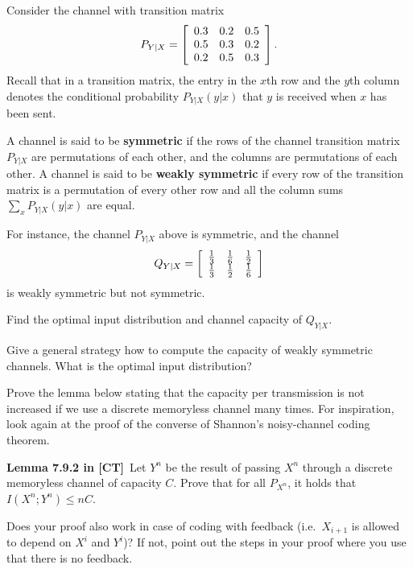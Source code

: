 \documentclass[a4paper,10pt,landscape,twocolumn]{scrartcl}
\begin{document}
\begin{exercise}
Consider the channel with transition matrix
\[
P_{Y|X} = \left[
\begin{array}{c c c}
0.3&0.2&0.5\\
0.5&0.3&0.2\\
0.2&0.5&0.3
\end{array}
\right].
\]
Recall that in a transition matrix, the entry in the $x$th row and the $y$th column denotes the conditional probability $P_{Y|X}(y|x)$ that $y$ is received when $x$ has been sent.

A channel is said to be \textbf{symmetric} if the rows of the channel transition matrix $P_{Y|X}$ are permutations of each other, and the columns are permutations of each other. A channel is said to be \textbf{weakly symmetric} if every row of the transition matrix is a permutation of every other row and all the column sums $\sum_x P_{Y|X}(y|x)$ are equal.

For instance, the channel $P_{Y|X}$ above is symmetric, and the channel
\[
Q_{Y|X} = \left[
\begin{array}{c c c}
\frac{1}{3}&\frac{1}{6}&\frac{1}{2}\\
\frac{1}{3}&\frac{1}{2}&\frac{1}{6}
\end{array}
\right]
\]
is weakly symmetric but not symmetric.
	\begin{subex}
	Find the optimal input distribution and channel capacity of $Q_{Y|X}$.
	\end{subex}
	\begin{subex}
	Give a general strategy how to compute the capacity of weakly symmetric channels. What is the optimal input distribution?
	\end{subex}
\end{exercise}

\begin{exercise}
Prove the lemma below stating that the capacity per transmission is not increased if we use a discrete memoryless channel many times. For inspiration, look again at the proof of the converse of Shannon's noisy-channel coding theorem.

\medskip
\noindent\textbf{Lemma 7.9.2 in [CT]}\  Let $Y^n$ be the result of passing $X^n$ through a discrete memoryless channel of capacity $C$. Prove that for all $P_{X^n}$, it holds that $I(X^n; Y^n) \leq nC$.
\medskip

Does your proof also work in case of coding with feedback (i.e.\ $X_{i+1}$ is allowed to depend on $X^i$ and $Y^i$)? If not, point out the steps in your proof where you use that there is no feedback.
\end{exercise}
\end{document}

